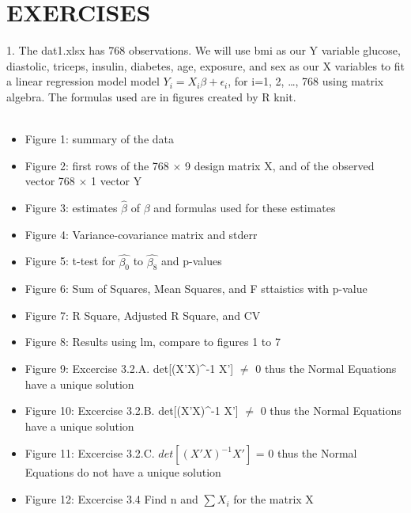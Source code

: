 \documentclass[letterpaper,11pt]{article}
\begin{document}
\section{EXERCISES}

1. The dat1.xlsx has 768 observations. We will use bmi as our Y variable glucose, diastolic, triceps, insulin, diabetes, age, exposure, and sex as our X variables to fit a linear regression model model $Y_{i} = X_{i} \beta + \epsilon_{i}$, for i=1, 2, \ldots, 768 using matrix algebra. The formulas used are in figures created by R knit.
\\ \\

	\begin{itemize}
	\item Figure 1: summary of the data 

	\item Figure 2: first rows of the 768 $\times$ 9 design matrix X, and of the observed vector 768 $\times$ 1 vector Y

	\item Figure 3: estimates $\hat{\beta}$ of $\beta$ and formulas used for these estimates
	
	\item Figure 4: Variance-covariance matrix and stderr

	\item Figure 5: t-test for $\hat{\beta_{0}}$ to $\hat{\beta_{8}}$ and p-values

	\item Figure 6: Sum of Squares, Mean Squares, and F sttaistics with p-value

	\item Figure 7: R Square, Adjusted R Square, and CV

	\item Figure 8: Results using lm, compare to figures 1 to 7
	
	\item Figure 9: Excercise 3.2.A. det[(X'X)^{-1} X'] $\neq$ 0 thus the Normal Equations have a unique solution  

	\item Figure 10: Excercise 3.2.B. det[(X'X)^{-1} X'] $\neq$ 0 thus the Normal Equations have a unique solution  

	\item Figure 11: Excercise 3.2.C. $det[(X'X)^{-1} X']$ = 0 thus the Normal Equations do not have a unique solution  
	
	\item Figure 12: Excercise 3.4 Find n and $\sum{X_{i}}$ for the matrix X
	\end{itemize}
		
\end{document}
